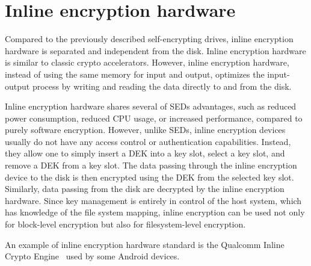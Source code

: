 

\section{Inline encryption hardware}

Compared to the previously described self-encrypting drives, inline encryption hardware is separated and independent from the disk. Inline encryption hardware is similar to classic crypto accelerators. However, inline encryption hardware, instead of using the same memory for input and output, optimizes the input-output process by writing and reading the data directly to and from the disk.

Inline encryption hardware shares several of SEDs advantages, such as reduced power consumption, reduced CPU usage, or increased performance, compared to purely software encryption.
However, unlike SEDs, inline encryption devices usually do not have any access control or authentication capabilities. Instead, they allow one to simply insert a DEK into a key slot, select a key slot, and remove a DEK from a key slot. The data passing through the inline encryption device to the disk is then encrypted using the DEK from the selected key slot. Similarly, data passing from the disk are decrypted by the inline encryption hardware.
Since key management is entirely in control of the host system, which has knowledge of the file system mapping, inline encryption can be used not only for block-level encryption but also for filesystem-level encryption.

An example of inline encryption hardware standard is the Qualcomm Inline Crypto Engine~\cite{qualcomm_ice} used by some Android devices.



